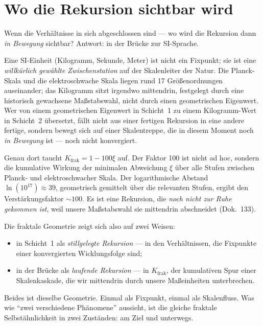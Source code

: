 \section{Wo die Rekursion sichtbar wird}

Wenn die Verhältnisse in sich abgeschlossen sind --- wo wird die
Rekursion dann \emph{in Bewegung} sichtbar? Antwort: in der Brücke zur
SI-Sprache.

Eine SI-Einheit (Kilogramm, Sekunde, Meter) ist nicht ein Fixpunkt; sie
ist eine \emph{willkürlich gewählte Zwischenstation} auf der Skalenleiter
der Natur. Die Planck-Skala und die elektroschwache Skala liegen rund 17
Größenordnungen auseinander; das Kilogramm sitzt irgendwo mittendrin,
festgelegt durch eine historisch gewachsene Maßstabswahl, nicht durch
einen geometrischen Eigenwert. Wer von einem geometrischen Eigenwert
in Schicht~1 zu einem Kilogramm-Wert in Schicht~2 übersetzt, fällt
nicht aus einer fertigen Rekursion in eine andere fertige, sondern
bewegt sich auf einer Skalentreppe, die in diesem Moment noch
\emph{in Bewegung} ist --- noch nicht konvergiert.

Genau dort taucht $K_{\mathrm{frak}} = 1 - 100\xi$ auf. Der Faktor 100
ist nicht ad hoc, sondern die kumulative Wirkung der minimalen
Abweichung $\xi$ über alle Stufen zwischen Planck- und elektroschwacher
Skala. Der logarithmische Abstand $\ln(10^{17}) \approx 39$, geometrisch
gemittelt über die relevanten Stufen, ergibt den Verstärkungsfaktor
$\sim 100$. Es ist eine Rekursion, die \emph{noch nicht zur Ruhe
gekommen ist}, weil unsere Maßstabswahl sie mittendrin abschneidet
(Dok.~133).

Die fraktale Geometrie zeigt sich also auf zwei Weisen:

\begin{itemize}\setlength\itemsep{2pt}
  \item in Schicht~1 als \emph{stillgelegte Rekursion} ---
        in den Verhältnissen, die Fixpunkte einer konvergierten
        Wicklungsfolge sind;
  \item in der Brücke als \emph{laufende Rekursion} ---
        in $K_{\mathrm{frak}}$, der kumulativen Spur einer
        Skalenkaskade, die wir mittendrin durch unsere Maßeinheiten
        unterbrechen.
\end{itemize}

\noindent
Beides ist dieselbe Geometrie. Einmal als Fixpunkt, einmal als
Skalenfluss. Was wie ``zwei verschiedene Phänomene'' aussieht, ist die
gleiche fraktale Selbstähnlichkeit in zwei Zuständen: am Ziel und
unterwegs.

